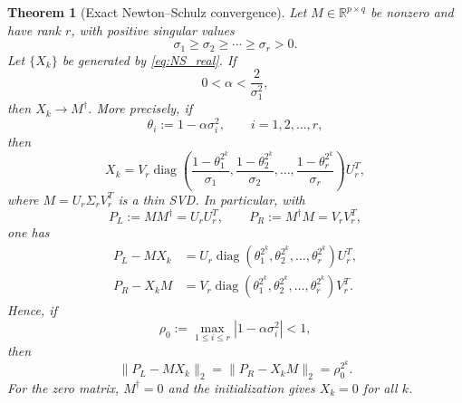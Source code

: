 \documentclass[10pt,a4paper]{amsart}
\newtheorem{theorem}{Theorem}
\begin{document}
\begin{theorem}[Exact Newton--Schulz convergence] \label{theorem1}
Let \(M\in\mathbb{R}^{p\times q}\) be nonzero and have rank \(r\), with positive singular values
\[
    \sigma_1\geq\sigma_2\geq\cdots\geq\sigma_r>0.
\]
Let \(\{X_k\}\) be generated by \eqref{eq:NS_real}. If
\begin{equation} \label{eq:alpha_interval}
    0<\alpha<\frac{2}{\sigma_1^2},
\end{equation}
then \(X_k\to M^\dagger\). More precisely, if
\[
    \theta_i:=1-\alpha\sigma_i^2, \qquad i=1,2,\ldots,r,
\]
then
\begin{equation}\label{eq:Xk_exact_formula}
    X_k =V_r\operatorname{diag}\!\left( \frac{1-\theta_1^{2^k}}{\sigma_1},\frac{1-\theta_2^{2^k}}{\sigma_2},\ldots, \frac{1-\theta_r^{2^k}}{\sigma_r} \right)U_r^T,
\end{equation}
where \(M=U_r\Sigma_rV_r^T\) is a thin SVD. In particular, with
\[
    P_L:=MM^\dagger=U_rU_r^T, \qquad P_R:=M^\dagger M=V_rV_r^T,
\]
one has
\begin{align}
    P_L-MX_k &=U_r\operatorname{diag}(\theta_1^{2^k},\theta_2^{2^k},\ldots,\theta_r^{2^k})U_r^T, \label{eq:left_projector_residual}
    \\ P_R-X_kM &=V_r\operatorname{diag}(\theta_1^{2^k},\theta_2^{2^k},\ldots,\theta_r^{2^k})V_r^T. \label{eq:right_projector_residual}
\end{align}
Hence, if
\[
    \rho_0:=\max_{1\leq i\leq r}|1-\alpha\sigma_i^2|<1,
\]
then
\begin{equation} \label{eq:projector_residual_rate}
    \|P_L-MX_k\|_2 =\|P_R-X_kM\|_2 =\rho_0^{2^k}.
\end{equation}
For the zero matrix, \(M^\dagger=0\) and the initialization gives \(X_k=0\) for all \(k\).
\end{theorem}
\end{document}
